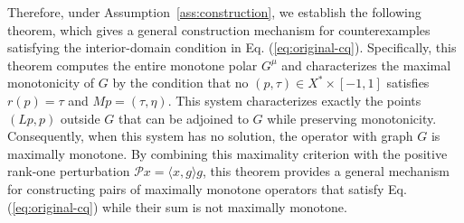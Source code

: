 \documentclass[11pt]{article}
\newcommand{\pair}[2]{\langle #1,#2\rangle}
\theoremstyle{definition}
\theoremstyle{remark}
\begin{document}
Therefore, under Assumption~\ref{ass:construction}, we establish the following theorem, which gives a general construction mechanism for counterexamples satisfying the interior-domain condition in Eq. (\ref{eq:original-cq}). Specifically, this theorem computes the entire monotone polar $G^\mu$ and characterizes the maximal monotonicity of $G$ by the condition that no $(p,\tau)\in X^*\times[-1,1]$ satisfies $r(p)=\tau$ and $Mp=(\tau,\eta)$.  This system characterizes exactly the points $(Lp,p)$ outside $G$ that can be adjoined to $G$ while preserving monotonicity. Consequently, when this system has no solution, the operator with graph $G$ is maximally monotone. By combining this maximality criterion with the positive rank-one perturbation $\mathcal P x=\pair{x}{g}g$, this theorem provides a general mechanism for constructing pairs of maximally monotone operators that satisfy Eq. (\ref{eq:original-cq}) while their sum is not maximally monotone. 
\end{document}
